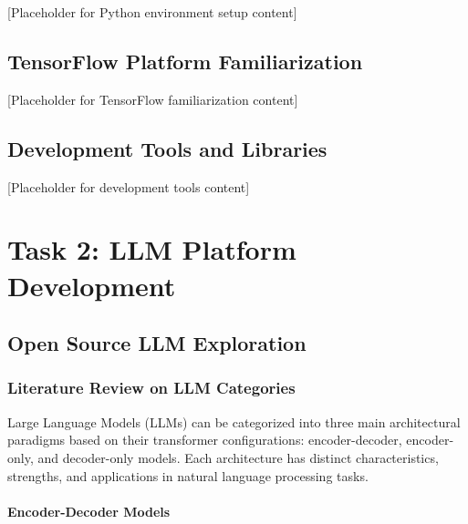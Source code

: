 \documentclass[12pt,a4paper]{article}
\begin{document}
[Placeholder for Python environment setup content]

\subsection{TensorFlow Platform Familiarization}

[Placeholder for TensorFlow familiarization content]

\subsection{Development Tools and Libraries}

[Placeholder for development tools content]

\section{Task 2: LLM Platform Development}

\subsection{Open Source LLM Exploration}


\subsubsection{Literature Review on LLM Categories}


Large Language Models (LLMs) can be categorized into three main architectural paradigms based on their transformer configurations: encoder-decoder, encoder-only, and decoder-only models. Each architecture has distinct characteristics, strengths, and applications in natural language processing tasks.

\paragraph{Encoder-Decoder Models}
\end{document}
